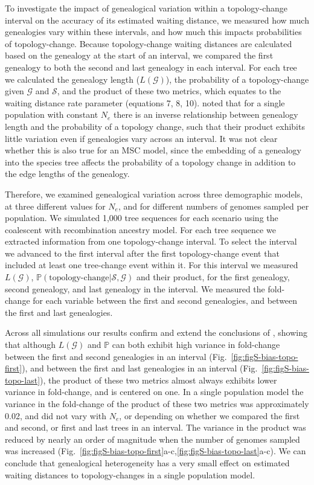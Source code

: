 \documentclass[11pt]{article}
\begin{document}
To investigate the impact of genealogical variation within a topology-change interval
on the accuracy of its estimated waiting distance, we measured how much genealogies vary
within these intervals, and how much this impacts probabilities of topology-change.
% 
Because topology-change waiting distances are calculated based on the genealogy
at the start of an interval, we compared the first genealogy to both the second
and last genealogy in each interval.
% 
For each tree we calculated the genealogy length ($L(\mathcal{G})$), 
the probability of a topology-change given $\mathcal{G}$ and $\mathcal{S}$,
and the product of these two metrics, which equates to the waiting distance 
rate parameter (equations 7, 8, 10).
% 
\citet{deng_distribution_2021} noted that for a single population with constant $N_e$
there is an inverse relationship between genealogy length and the probability of a 
topology change, such that their product exhibits little variation even if genealogies
vary across an interval.
% 
It was not clear whether this is also true for an MSC model, since the embedding of
a genealogy into the species tree affects the probability of a topology change in 
addition to the edge lengths of the genealogy. 
% 


Therefore, we examined genealogical variation across three demographic models, 
at three different values for $N_e$, and for different numbers of genomes sampled
per population. We simulated 1,000 tree sequences for each scenario using the 
coalescent with recombination ancestry model. 
% 
For each tree sequence we extracted information from one topology-change interval. 
To select the interval we advanced to the first interval after the first topology-change 
event that included at least one tree-change event within it.
For this interval we measured $L(\mathcal{G})$, 
$\mathbb{P}(\textrm{topology-change}| \mathcal{S}, \mathcal{G})$ and their
product, for the first genealogy, second genealogy, and last genealogy in the interval.
We measured the fold-change for each variable between the first and second 
genealogies, and between the first and last genealogies.
% 


Across all simulations our results confirm and extend the conclusions of 
\citet{deng_distribution_2021}, showing that although $L(\mathcal{G})$ 
and $\mathbb{P}$ can both exhibit high variance in fold-change between the 
first and second genealogies in an interval (Fig.~\ref{fig:figS-bias-topo-first}), 
and between the first and last genealogies in an interval (Fig.~\ref{fig:figS-bias-topo-last}),
the product of these two metrics almost always exhibits lower variance in
fold-change, and is centered on one.
% 
In a single population model the variance in the fold-change of the product of
these two metrics was approximately 0.02, and did not vary with $N_e$, or 
depending on whether we compared the first and second, or first and last
trees in an interval. The variance in the product was reduced by nearly 
an order of magnitude when the number of genomes sampled was increased 
(Fig.~\ref{fig:figS-bias-topo-first}a-c,\ref{fig:figS-bias-topo-last}a-c).
We can conclude that genealogical heterogeneity has a very small effect
on estimated waiting distances to topology-changes in a single population model.
\end{document}
